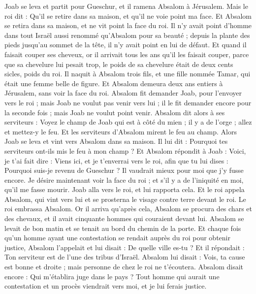 \begin{multicols}{2}
Joab se leva et partit pour Gueschur, et il ramena Absalom à Jérusalem.
Mais le roi dit : Qu'il se retire dans sa maison, et qu'il ne voie point ma face. Et Absalom se retira dans sa maison, et ne vit point la face du roi.
Il n'y avait point d'homme dans tout Israël aussi renommé qu'Absalom pour sa beauté ; depuis la plante des pieds jusqu'au sommet de la tête, il n'y avait point en lui de défaut.
Et quand il faisait couper ses cheveux, or il arrivait tous les ans qu'il les faisait couper, parce que sa chevelure lui pesait trop, le poids de sa chevelure était de deux cents sicles, poids du roi.
Il naquit à Absalom trois fils, et une fille nommée Tamar, qui était une femme belle de figure.
Et Absalom demeura deux ans entiers à Jérusalem, sans voir la face du roi.
Absalom fit demander Joab, pour l'envoyer vers le roi ; mais Joab ne voulut pas venir vers lui ; il le fit demander encore pour la seconde fois ; mais Joab ne voulut point venir.
Absalom dit alors à ses serviteurs : Voyez le champ de Joab qui est à côté du mien ; il y a de l'orge ; allez et mettez-y le feu. Et les serviteurs d'Absalom mirent le feu au champ.
Alors Joab se leva et vint vers Absalom dans sa maison. Il lui dit : Pourquoi tes serviteurs ont-ils mis le feu à mon champ ?
Et Absalom répondit à Joab : Voici, je t'ai fait dire : Viens ici, et je t'enverrai vers le roi, afin que tu lui dises : Pourquoi suis-je revenu de Gueschur ? Il vaudrait mieux pour moi que j'y fusse encore. Je désire maintenant voir la face du roi ; et s'il y a de l'iniquité en moi, qu'il me fasse mourir.
Joab alla vers le roi, et lui rapporta cela. Et le roi appela Absalom, qui vint vers lui et se prosterna le visage contre terre devant le roi. Le roi embrassa Absalom.
\VerseOne{}Or il arriva qu'après cela, Absalom se procura des chars et des chevaux, et il avait cinquante hommes qui couraient devant lui.
Absalom se levait de bon matin et se tenait au bord du chemin de la porte. Et chaque fois qu'un homme ayant une contestation se rendait auprès du roi pour obtenir justice, Absalom l'appelait et lui disait : De quelle ville es-tu ? Et il répondait : Ton serviteur est de l'une des tribus d'Israël.
Absalom lui disait : Vois, ta cause est bonne et droite ; mais personne de chez le roi ne t'écoutera.
Absalom disait encore : Qui m'établira juge dans le pays ? Tout homme qui aurait une contestation et un procès viendrait vers moi, et je lui ferais justice.

\end{multicols}
